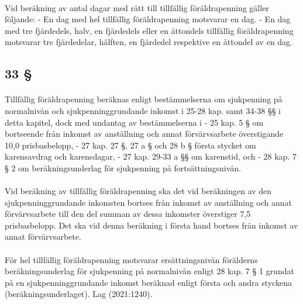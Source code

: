 \documentclass[a4paper,notitlepage,openany,10pt]{book}
\begin{document}
\paragraph*{}
Vid beräkning av antal dagar med rätt till tillfällig föräldrapenning gäller följande:
\newline - En dag med hel tillfällig föräldrapenning motsvarar en dag.
\newline - En dag med tre fjärdedels, halv, en fjärdedels eller en åttondels tillfällig föräldrapenning motsvarar tre fjärdedelar, hälften, en fjärdedel respektive en åttondel av en dag.
\subsection*{33 §}
\paragraph*{}
Tillfällig föräldrapenning beräknas enligt bestämmelserna om sjukpenning på normalnivån och sjukpenninggrundande inkomst i 25-28 kap. samt 34-38 §§ i detta kapitel, dock med undantag av bestämmelserna i
\newline - 25 kap. 5 § om bortseende från inkomst av anställning och annat förvärvsarbete överstigande 10,0 prisbasbelopp,
\newline - 27 kap. 27 §, 27 a § och 28 b § första stycket om karensavdrag och karensdagar,
\newline - 27 kap. 29-33 a §§ om karenstid, och
\newline - 28 kap. 7 § 2 om beräkningsunderlag för sjukpenning på fortsättningsnivån.
\paragraph*{}
Vid beräkning av tillfällig föräldrapenning ska det vid beräkningen av den sjukpenninggrundande inkomsten bortses från inkomst av anställning och annat förvärvsarbete till den del summan av dessa inkomster överstiger 7,5 prisbasbelopp. Det ska vid denna beräkning i första hand bortses från inkomst av annat förvärvsarbete.
\paragraph*{}
För hel tillfällig föräldrapenning motsvarar ersättningsnivån förälderns beräkningsunderlag för sjukpenning på normalnivån enligt 28 kap. 7 § 1 grundat på en sjukpenninggrundande inkomst beräknad enligt första och andra styckena (beräkningsunderlaget).
Lag (2021:1240).
\end{document}
